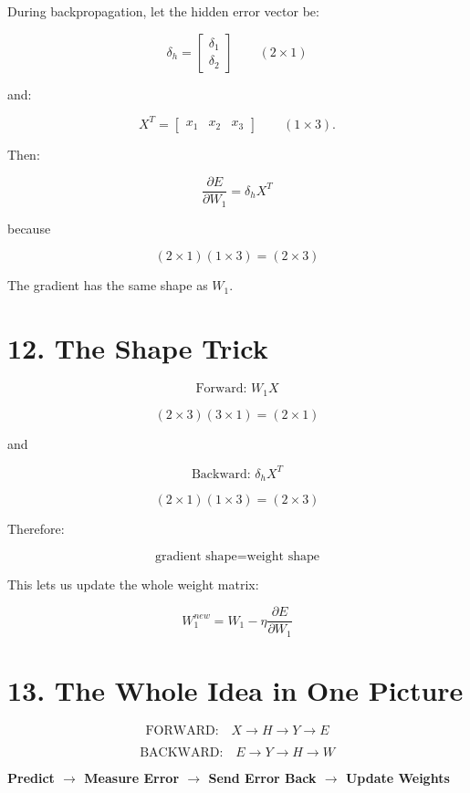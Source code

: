 \documentclass[11pt]{article}
\begin{document}
During backpropagation, let the hidden error vector be:

\[
\delta_h=
\begin{bmatrix}
\delta_1\\
\delta_2
\end{bmatrix}
\qquad(2\times1)
\]

and:

\[
X^T=
\begin{bmatrix}
x_1&x_2&x_3
\end{bmatrix}
\qquad(1\times3).
\]

Then:

\[
\boxed{
\frac{\partial E}{\partial W_1}
=
\delta_hX^T
}
\]

because

\[
\boxed{
(2\times1)(1\times3)=(2\times3)
}
\]

The gradient has the same shape as $W_1$.

\section*{12. The Shape Trick}

\[
\boxed{
\text{Forward: }W_1X
}
\]

\[
(2\times3)(3\times1)=(2\times1)
\]

and

\[
\boxed{
\text{Backward: }\delta_hX^T
}
\]

\[
(2\times1)(1\times3)=(2\times3)
\]

Therefore:

\[
\boxed{\text{gradient shape}=\text{weight shape}}
\]

This lets us update the whole weight matrix:

\[
\boxed{
W_1^{new}
=
W_1-\eta\frac{\partial E}{\partial W_1}
}
\]

\section*{13. The Whole Idea in One Picture}

\[
\boxed{
\text{FORWARD:}\quad
X\rightarrow H\rightarrow Y\rightarrow E
}
\]

\[
\boxed{
\text{BACKWARD:}\quad
E\rightarrow Y\rightarrow H\rightarrow W
}
\]

\begin{tcolorbox}
\centering
\textbf{Predict $\rightarrow$ Measure Error $\rightarrow$ Send Error Back $\rightarrow$ Update Weights}
\end{tcolorbox}
\end{document}
